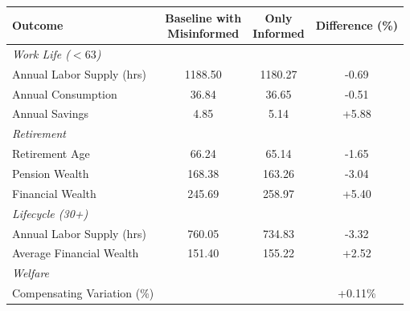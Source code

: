   \begin{tabular}{lccc}
    \toprule
    Outcome & \makecell{Baseline with \\ Misinformed} & \makecell{Only \\ Informed} & Difference (\%) \\
    \midrule
    \midrule
    \multicolumn{4}{l}{\textit{Work Life ($<63$)}} \\
    Annual Labor Supply (hrs) & 1188.50 & 1180.27 & -0.69 \\
    Annual Consumption & 36.84 & 36.65 & -0.51 \\
    Annual Savings & 4.85 & 5.14 & +5.88 \\
    \midrule
    \multicolumn{4}{l}{\textit{Retirement}} \\
    Retirement Age & 66.24 & 65.14 & -1.65 \\
    Pension Wealth & 168.38 & 163.26 & -3.04 \\
    Financial Wealth & 245.69 & 258.97 & +5.40 \\
    \midrule
    \multicolumn{4}{l}{\textit{Lifecycle (30+)}} \\
    Annual Labor Supply (hrs) & 760.05 & 734.83 & -3.32 \\
    Average Financial Wealth & 151.40 & 155.22 & +2.52 \\
    \midrule
    \multicolumn{4}{l}{\textit{Welfare}} \\
    Compensating Variation (\%) & & & +0.11\% \\
    \bottomrule
  \end{tabular}
